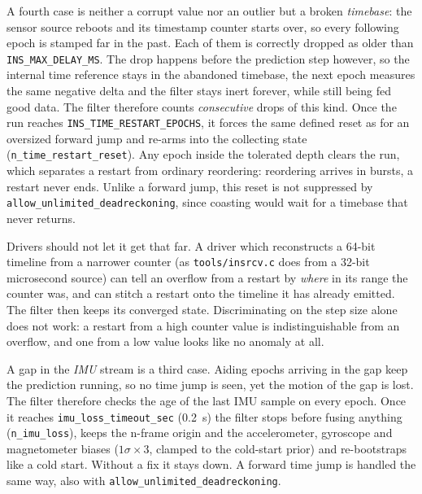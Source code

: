 \documentclass[11pt,a4paper]{article}
\newcommand{\code}[1]{\texttt{#1}}
\begin{document}
A fourth case is neither a corrupt value nor an outlier but a broken
\emph{timebase}: the sensor source reboots and its timestamp counter starts
over, so every following epoch is stamped far in the past. Each of them is
correctly dropped as older than
\code{INS\_\allowbreak{}MAX\_\allowbreak{}DELAY\_\allowbreak{}MS}. The drop
happens before the prediction step however, so the internal time reference stays
in the abandoned timebase, the next epoch measures the same negative delta and
the filter stays inert forever, while still being fed good data. The filter
therefore counts \emph{consecutive} drops of this kind. Once the run reaches
\code{INS\_\allowbreak{}TIME\_\allowbreak{}RESTART\_\allowbreak{}EPOCHS}, it
forces the same defined reset as for an oversized forward jump and re-arms into
the collecting state
(\code{n\_\allowbreak{}time\_\allowbreak{}restart\_\allowbreak{}reset}). Any
epoch inside the tolerated depth clears the run, which separates a restart from
ordinary reordering: reordering arrives in bursts, a restart never ends. Unlike
a forward jump, this reset is not suppressed by
\code{allow\_\allowbreak{}unlimited\_\allowbreak{}deadreckoning}, since
coasting would wait for a timebase that never returns.

Drivers should not let it get that far. A driver which reconstructs a 64-bit
timeline from a narrower counter (as \code{tools/insrcv.c} does from a 32-bit
microsecond source) can tell an overflow from a restart by \emph{where} in its
range the counter was, and can stitch a restart onto the timeline it has already
emitted. The filter then keeps its converged state. Discriminating on the step
size alone does not work: a restart from a high counter value is
indistinguishable from an overflow, and one from a low value looks like no
anomaly at all.

A gap in the \emph{IMU} stream is a third case. Aiding epochs arriving in the
gap keep the prediction running, so no time jump is seen, yet the motion of
the gap is lost. The filter therefore checks the age of the last IMU sample on
every epoch. Once it reaches
\code{imu\_\allowbreak{}loss\_\allowbreak{}timeout\_\allowbreak{}sec}
(\SI{0.2}{\second}) the filter stops before fusing anything
(\code{n\_\allowbreak{}imu\_\allowbreak{}loss}), keeps the n-frame origin and
the accelerometer, gyroscope and magnetometer biases ($1\sigma \times 3$,
clamped to the cold-start prior) and re-bootstraps like a cold start. Without
a fix it stays down. A forward time jump is handled the same way, also with
\code{allow\_\allowbreak{}unlimited\_\allowbreak{}deadreckoning}.
\end{document}
